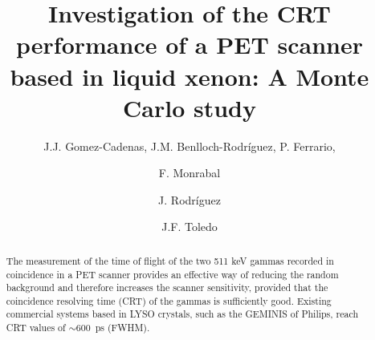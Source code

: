 \documentclass[review]{elsarticle}
\begin{document}
\begin{frontmatter}

\title{Investigation of the CRT performance of a PET scanner based in liquid xenon: A Monte Carlo study}

\author{J.J. Gomez-Cadenas, J.M. Benlloch-Rodr\'iguez, P. Ferrario, }
\address{Instituto de F\'isica Corpuscular (IFIC), CSIC \& Universitat de Val\`encia,
Calle Catedr\'atico Jos\'e Beltr\'an, 2, 46980 Paterna, Valencia, Spain}
\author{F. Monrabal}
\address{G.}
\author{J. Rodr\'iguez}
\address{Instituto de F\'isica Corpuscular (IFIC), CSIC \& Universitat de Val\`encia,
Calle Catedr\'atico Jos\'e Beltr\'an, 2, 46980 Paterna, Valencia, Spain}
\author{J.F. Toledo}
\address{Instituto de Instrumentaci\'on para Imagen Molecular (I3M), Universitat Polit\`ecnica de Val\`encia\\ 
Camino de Vera, s/n, Edificio 8B, 46022 Valencia, Spain}




%


%
%

\begin{abstract}
The measurement of the time of flight of the two 511 keV gammas recorded in coincidence in a PET scanner provides an effective way of reducing the random background and therefore increases the scanner sensitivity, provided that the coincidence resolving time (CRT) of the gammas is sufficiently good. Existing commercial systems based in LYSO crystals, such as the GEMINIS of Philips, reach CRT values of 
$\sim 600$~ps (FWHM). 


\end{abstract}
\end{frontmatter}
\end{document}
